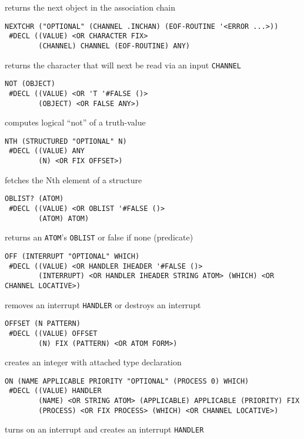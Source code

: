 \documentclass[a4paper,]{article}
\begin{document}
returns the next object in the association chain

\begin{verbatim}
NEXTCHR ("OPTIONAL" (CHANNEL .INCHAN) (EOF-ROUTINE '<ERROR ...>))
 #DECL ((VALUE) <OR CHARACTER FIX>
        (CHANNEL) CHANNEL (EOF-ROUTINE) ANY)
\end{verbatim}

returns the character that will next be read via an input \texttt{CHANNEL}

\begin{verbatim}
NOT (OBJECT)
 #DECL ((VALUE) <OR 'T '#FALSE ()>
        (OBJECT) <OR FALSE ANY>)
\end{verbatim}

computes logical ``not'' of a truth-value

\begin{verbatim}
NTH (STRUCTURED "OPTIONAL" N)
 #DECL ((VALUE) ANY
        (N) <OR FIX OFFSET>)
\end{verbatim}

fetches the Nth element of a structure

\begin{verbatim}
OBLIST? (ATOM)
 #DECL ((VALUE) <OR OBLIST '#FALSE ()>
        (ATOM) ATOM)
\end{verbatim}

returns an \texttt{ATOM}'s \texttt{OBLIST} or false if none (predicate)

\begin{verbatim}
OFF (INTERRUPT "OPTIONAL" WHICH)
 #DECL ((VALUE) <OR HANDLER IHEADER '#FALSE ()>
        (INTERRUPT) <OR HANDLER IHEADER STRING ATOM> (WHICH) <OR CHANNEL LOCATIVE>)
\end{verbatim}

removes an interrupt \texttt{HANDLER} or destroys an interrupt

\begin{verbatim}
OFFSET (N PATTERN)
 #DECL ((VALUE) OFFSET
        (N) FIX (PATTERN) <OR ATOM FORM>)
\end{verbatim}

creates an integer with attached type declaration

\begin{verbatim}
ON (NAME APPLICABLE PRIORITY "OPTIONAL" (PROCESS 0) WHICH)
 #DECL ((VALUE) HANDLER
        (NAME) <OR STRING ATOM> (APPLICABLE) APPLICABLE (PRIORITY) FIX
        (PROCESS) <OR FIX PROCESS> (WHICH) <OR CHANNEL LOCATIVE>)
\end{verbatim}

turns on an interrupt and creates an interrupt \texttt{HANDLER}
\end{document}
